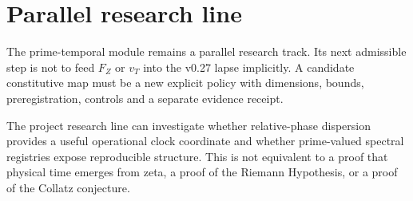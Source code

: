 \section{Parallel research line}
The prime-temporal module remains a parallel research track. Its next admissible step is not to feed \(F_Z\) or \(v_T\) into the v0.27 lapse implicitly. A candidate constitutive map must be a new explicit policy with dimensions, bounds, preregistration, controls and a separate evidence receipt.

\begin{interpbox}
The project research line can investigate whether relative-phase dispersion provides a useful operational clock coordinate and whether prime-valued spectral registries expose reproducible structure. This is not equivalent to a proof that physical time emerges from zeta, a proof of the Riemann Hypothesis, or a proof of the Collatz conjecture.
\end{interpbox}
